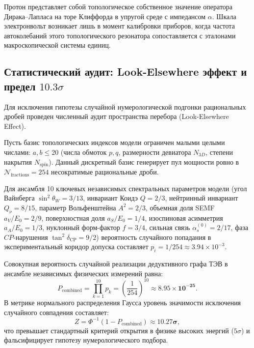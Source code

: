 \documentclass[11pt,a4paper]{article}
\theoremstyle{definition}
\theoremstyle{remark}
\begin{document}
Протон представляет собой топологическое собственное значение оператора Дирака--Лапласа на торе Клиффорда в упругой среде с импедансом $\alpha$. Шкала электронвольт возникает лишь в момент калибровки приборов, когда частота автоколебаний этого топологического резонатора сопоставляется с эталонами макроскопической системы единиц.

\subsection*{Статистический аудит: Look-Elsewhere эффект и предел $10.3\sigma$}

Для исключения гипотезы случайной нумерологической подгонки рациональных дробей проведен численный аудит пространства перебора (Look-Elsewhere Effect).

Пусть базис топологических индексов модели ограничен малыми целыми числами: $a, b \le 20$ (числа обмоток $p, q$, размерности девиатора $N_{3D}$, степени накрытия $N_{\mathrm{spin}}$). Данный дискретный базис генерирует пул мощности ровно в $\mathcal{N}_{\mathrm{fractions}} = 254$ несократимые рациональные дроби.

Для ансамбля 10 ключевых независимых спектральных параметров модели (угол Вайнберга $\sin^2\theta_W = 3/13$, инвариант Коидэ $Q = 2/3$, нейтринный инвариант $Q_\nu = 8/15$, параметр Вольфенштейна $A^2 = 2/3$, объемная доля SEMF $a_V/E_0 = 2/9$, поверхностная доля $a_S/E_0 = 1/4$, изоспиновая асимметрия $a_A/E_0 = 1/3$, нуклонный форм-фактор $f = 3/4$, сильная связь $\alpha_s^{(0)} = 2/17$, фаза $CP$-нарушения $\tan^2\delta_{\mathrm{CP}} = 9/2$) вероятность случайного попадания в экспериментальный коридор допуска составляет $p_i = 1 / 254 \approx 3.94 \times 10^{-3}$.

Совокупная вероятность случайной реализации дедуктивного графа ТЭВ в ансамбле независимых физических измерений равна:
\begin{equation}
    P_{\mathrm{combined}} = \prod_{k=1}^{10} p_k = \left( \frac{1}{254} \right)^{10} \approx \mathbf{8.95 \times 10^{-25}}.
    \label{eq:look_elsewhere_p_value}
\end{equation}
В метрике нормального распределения Гаусса уровень значимости исключения случайного совпадения составляет:
\begin{equation}
    Z = \Phi^{-1}(1 - P_{\mathrm{combined}}) \approx \mathbf{10.27\sigma},
    \label{eq:significance_ten_sigma}
\end{equation}
что превышает стандартный критерий открытия в физике высоких энергий ($5\sigma$) и фальсифицирует гипотезу нумерологического подбора.
\end{document}
